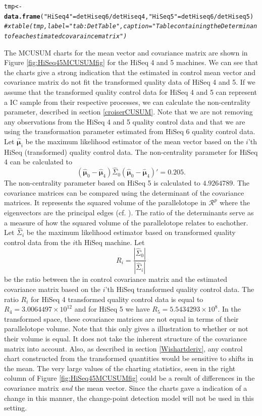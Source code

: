 \documentclass[a4paper,11pt,fleqn,twoside,notitlepage]{report}
\makeatletter
\newcommand{\hlstr}[1]{\textcolor[rgb]{0.192,0.494,0.8}{#1}}%
\newcommand{\hlcom}[1]{\textcolor[rgb]{0.678,0.584,0.686}{\textit{#1}}}%
\newcommand{\hlopt}[1]{\textcolor[rgb]{0,0,0}{#1}}%
\newcommand{\hlstd}[1]{\textcolor[rgb]{0.345,0.345,0.345}{#1}}%
\newcommand{\hlkwb}[1]{\textcolor[rgb]{0.69,0.353,0.396}{#1}}%
\newcommand{\hlkwd}[1]{\textcolor[rgb]{0.737,0.353,0.396}{\textbf{#1}}}%
\newenvironment{kframe}{%
 \def\at@end@of@kframe{}%
 \ifinner\ifhmode%
  \def\at@end@of@kframe{\end{minipage}}%
  \begin{minipage}{\columnwidth}%
 \fi\fi%
 \def\FrameCommand##1{\hskip\@totalleftmargin \hskip-\fboxsep
 \colorbox{shadecolor}{##1}\hskip-\fboxsep
     \hskip-\linewidth \hskip-\@totalleftmargin \hskip\columnwidth}%
 \MakeFramed {\advance\hsize-\width
   \@totalleftmargin\z@ \linewidth\hsize
   \@setminipage}}%
 {\par\unskip\endMakeFramed%
 \at@end@of@kframe}
\newenvironment{knitrout}{}{} %
\makeatother
\begin{document}
\begin{knitrout}
\begin{kframe}
\begin{alltt}
\hlstd{tmp} \hlkwb{<-} \hlkwd{data.frame}\hlstd{(}\hlstr{"HiSeq 4"} \hlstd{= detHiseq6}\hlopt{/}\hlstd{detHiseq4,} \hlstr{"HiSeq 5"} \hlstd{= detHiseq6}\hlopt{/}\hlstd{detHiseq5)}
\hlcom{#xtable(tmp, label="tab:DetTable", caption="Table containing the Determinant of each estimated covaraince matrix")}
\end{alltt}
\end{kframe}
\end{knitrout}
The MCUSUM charts for the mean vector and covariance matrix are shown in Figure \ref{fig:HiSeq45MCUSUMfig} for the HiSeq 4 and 5 machines. We can see that the charts give a strong indication that the estimated in control mean vector and covariance matrix do not fit the transformed quality data of HiSeq 4 and 5. If we assume that the transformed quality control data for HiSeq 4 and 5 can represent a IC sample from their respective processes, we can calculate the non-centrality parameter, described in section \ref{croiserCUSUM}. Note that we are not removing any observations from the HiSeq 4 and 5 quality control data and that we are using the transformation parameter estimated from HiSeq 6 quality control data. Let $\hat{\boldsymbol{\mu}}_{i}$ be the maximum likelihood estimator of the mean vector based on the $i$'th HiSeq (transformed) quality control data. The non-centrality parameter for HiSeq 4 can be calculated to 
$$
(\hat{\boldsymbol{\mu}}_{0}-\hat{\boldsymbol{\mu}}_{4})\widehat{\Sigma}_0(\hat{\boldsymbol{\mu}}_{0}-\hat{\boldsymbol{\mu}}_{4})'=0.205.
$$
The non-centrality parameter based on HiSeq 5 is calculated to $4.9264789$. The covariance matrices can be compared using the determinant of the covariance matrices. It represents the squared volume of the parallelotope in $\mathcal{R}^p$ where the eigenvectors are the principal edges (cf. \citet[page 385]{MultStatAnalysis}). The ratio of the determinants serve as a measure of how the squared volume of the parallelotope relates to eachother. Let $\widehat{\Sigma}_i$ be the maximum likelihood estimator based on transformed quality control data from the $i$th HiSeq machine. Let
$$
R_{i} = \frac{|\widehat{\Sigma}_0|}{|\widehat{\Sigma}_i|}
$$
be the ratio between the in control covariance matrix and the estimated covariance matrix based on the $i$'th HiSeq transformed quality control data. The ratio $R_{i}$ for HiSeq 4 transformed quality control data is equal to $R_{4}=\ensuremath{3.0064497\times 10^{12}}$ and for HiSeq 5 we have $R_{5}=\ensuremath{5.5434293\times 10^{8}}$. In the transformed space, these covariance matrices are not equal in terms of their parallelotope volume. Note that this only gives a illustration to whether or not their volume is equal. It does not take the inherent structure of the covariance matrix into account. Also, as described in section \ref{Wishartderiv}, any control chart constructed from the transformed quantities would be sensitive to shifts in the mean. The very large values of the charting statistics, seen in the right column of Figure \ref{fig:HiSeq45MCUSUMfig} could be a result of differences in the covariance matrix \textit{and} the mean vector. Since the charts gave a indication of a change in this manner, the change-point detection model will not be used in this setting.
\end{document}

